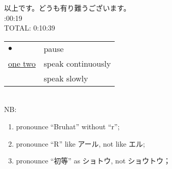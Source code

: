 \documentclass[12pt]{article} %
\newcommand{\kana}[2]{\ruby{#1}{#2}}
\newcounter{framecount}
\newcommand{\slide}{\noindent\stepcounter{framecount}$\backslash\backslash$[\arabic{framecount}]\\}
\newcommand{\mytime}[1]{\noindent #1\\}
\newcommand{\doubt}[1]{\fbox{#1}}
\begin{document}

\noindent 以上です。どうも有り難うございます。\\
\mytime{0:00:19}

TOTAL: 0:10:39\\
\begin{tabular}[]{l|l}
	$\bullet$&pause\\
	\underline{one two}&speak continuously\\
	\dashuline{diffffficult}&speak slowly
\end{tabular}\\
NB:\begin{enumerate}
	\item pronounce ``Bruhat'' without ``r'';
	\item pronounce ``R'' like アール, not like エル;
	\item pronounce ``初等'' as ショトウ, not ショウトウ；
\end{enumerate}
\end{document}
